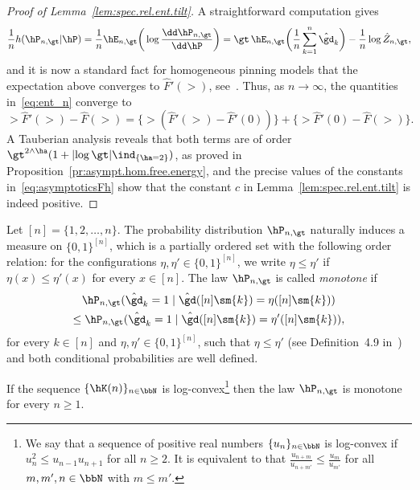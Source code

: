 \begin{proof}[Proof of Lemma~\ref{lem:spec.rel.ent.tilt}] A straightforward computation gives
\begin{equation}\label{eq:ent_n}
\frac{1}{n} h(\hP_{n,\gt} | \hP) = \frac{1}{n} \hE_{n,\gt} \bigg(\log \frac{\dd \hP_{n,\gt}}{\dd \hP} \bigg) = \gt \, \hE_{n,\gt} \bigg(\frac{1}{n} \sum_{k=1}^n {\hat \gd_k} \bigg) - \frac{1}{n} \log \hat Z_{n,\gt},
\end{equation}
and it is now a standard fact for homogeneous pinning models that the expectation above converges to $\hat F'(\gt)$, see~\cite[Section~2.4]{Gi2007}. Thus, as $n \to \infty$, the quantities in~\eqref{eq:ent_n} converge to
\begin{equation}
\gt \hat F'(\gt) - \hat F(\gt) = \{\gt (\hat F'(\gt) - \hat F'(0))\} + \{\gt \hat F'(0) - \hat F(\gt)\}.
\end{equation}
A Tauberian analysis reveals that both terms are of order $\gt^{2 \wedge \ha}{(1+ |{\log \gt}| \ind_{\{\ha = 2\}})}$, as proved in Proposition~\ref{pr:asympt.hom.free.energy}, and the precise values of the constants in~\eqref{eq:asymptoticsFh} show that the constant $c$ in Lemma~\ref{lem:spec.rel.ent.tilt} is indeed positive.
\end{proof}

Let $[n] = \{1,2,\ldots,n\}$. The probability distribution $\hP_{n,\gt}$ naturally induces a meas\-ure on $\{0,1\}^{[n]}$, which is a partially ordered set with the following order relation: for the configurations $\eta, \eta' \in \{0,1\}^{[n]}$, we write $\eta \leq \eta'$ if $\eta(x) \leq \eta'(x)$ for every $x \in[n]$. The law $\hP_{n,\gt}$ is called \emph{monotone} if
\begin{multline}\label{RFCondProbability}
\hP_{n,\gt}(\hat \gd_k = 1 \mid \hat \gd([n] \sm \{k\}) = \eta([n] \sm \{k\})) \\ \leq \hP_{n,\gt}(\hat \gd_k = 1 \mid \hat \gd([n] \sm \{k\}) = \eta'([n] \sm \{k\})),
\end{multline}
for every $k\in[n]$ and $\eta, \eta' \in \{0,1\}^{[n]}$, such that $\eta \leq \eta'$ (see Definition~4.9 in~\cite{GHM1999}) and both conditional probabilities are well defined.

\begin{lemm} \label{lem:mon.pro}
If the sequence $\{\hK(n)\}_{n \in \bbN}$ is log-\linebreak convex\footnote{We say that a sequence of positive real numbers $\{u_n\}_{n \in \bbN}$ is log-convex if $u_n^2 \leq u_{n-1} u_{n+1}$ for all $n \geq 2$. It is equivalent to that $\frac{u_{n+m}}{u_{n+m'}} \leq \frac{u_m}{u_{m'}}$ for all $m, m',n\in \bbN$ with $m \leq m'$. } then the law $\hP_{n,\gt}$ is monotone for every $n \geq 1$.
\end{lemm}

